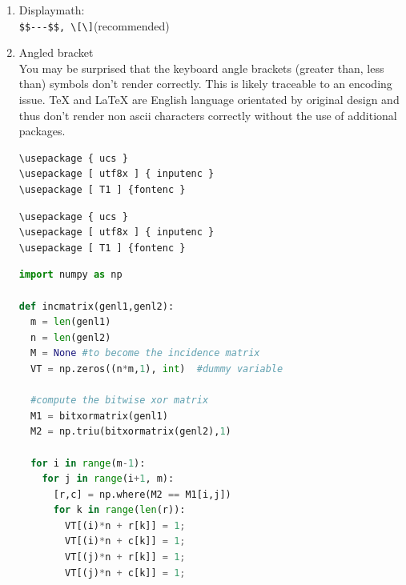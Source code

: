 \documentclass[12pt,a4paper]{report}
\begin{document}
\begin{enumerate}
\item Displaymath:\\
\verb|$$---$$, \[\]|(recommended)

\item Angled bracket\\
You may be surprised that the keyboard angle brackets (greater than, less than) symbols 
don't render correctly. This is likely traceable to an encoding issue. TeX and LaTeX are 
English language orientated by original design and thus don't render non ascii characters
correctly without the use of additional packages.
\begin{verbatim}
\usepackage { ucs } 
\usepackage [ utf8x ] { inputenc } 
\usepackage [ T1 ] {fontenc }
\end{verbatim}


\lstset{basicstyle=\ttfamily\footnotesize,breaklines=true}


\begin{lstlisting}[language={[LaTeX]TeX}, style=latex]
\usepackage { ucs } 
\usepackage [ utf8x ] { inputenc } 
\usepackage [ T1 ] {fontenc }
\end{lstlisting}



\begin{lstlisting}[language=Python]
import numpy as np

def incmatrix(genl1,genl2):
  m = len(genl1)
  n = len(genl2)
  M = None #to become the incidence matrix
  VT = np.zeros((n*m,1), int)  #dummy variable
  
  #compute the bitwise xor matrix
  M1 = bitxormatrix(genl1)
  M2 = np.triu(bitxormatrix(genl2),1) 
  
  for i in range(m-1):
    for j in range(i+1, m):
      [r,c] = np.where(M2 == M1[i,j])
      for k in range(len(r)):
        VT[(i)*n + r[k]] = 1;
        VT[(i)*n + c[k]] = 1;
        VT[(j)*n + r[k]] = 1;
        VT[(j)*n + c[k]] = 1;
  

\end{lstlisting}
\end{enumerate}
\end{document}
